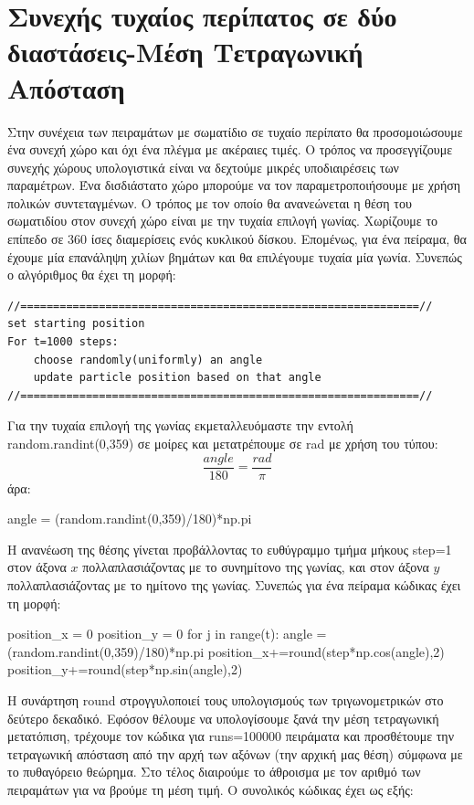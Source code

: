 \section{Συνεχής τυχαίος περίπατος σε δύο διαστάσεις-Μέση Τετραγωνική Απόσταση}
\label{CRW}
Στην συνέχεια των πειραμάτων με σωματίδιο σε τυχαίο περίπατο θα προσομοιώσουμε ένα συνεχή χώρο και όχι ένα πλέγμα με ακέραιες τιμές. Ο τρόπος να προσεγγίζουμε συνεχής χώρους υπολογιστικά είναι να δεχτούμε μικρές υποδιαιρέσεις των παραμέτρων. Ένα δισδιάστατο χώρο μπορούμε να τον παραμετροποιήσουμε με χρήση πολικών συντεταγμένων. Ο τρόπος με τον οποίο θα ανανεώνεται η θέση του σωματιδίου στον συνεχή χώρο είναι με την τυχαία επιλογή γωνίας. Χωρίζουμε το επίπεδο σε 360 ίσες διαμερίσεις ενός κυκλικού δίσκου. Επομένως, για ένα πείραμα, θα έχουμε μία επανάληψη χιλίων βημάτων και θα επιλέγουμε τυχαία μία γωνία. Συνεπώς ο αλγόριθμος θα έχει τη μορφή:
\en
\begin{lstlisting}
//=============================================================//
set starting position 
For t=1000 steps:
    choose randomly(uniformly) an angle 
    update particle position based on that angle
//=============================================================//
\end{lstlisting}
\gr 
Για την τυχαία επιλογή της γωνίας εκμεταλλευόμαστε την εντολή { \en random.randint(0,359)} σε μοίρες και μετατρέπουμε σε {\en rad} με χρήση του τύπου: 
\begin{equation}
\frac{angle}{180}=\frac{rad}{\pi}
\end{equation}
άρα:
\en
\begin{python}
angle = (random.randint(0,359)/180)*np.pi
\end{python}
\gr 
Η ανανέωση της θέσης γίνεται προβάλλοντας το ευθύγραμμο τμήμα μήκους {\en step}=1 στον άξονα $x$ πολλαπλασιάζοντας με το συνημίτονο της γωνίας, και στον άξονα $y$ πολλαπλασιάζοντας με το ημίτονο της γωνίας.
\noindent
Συνεπώς για ένα πείραμα κώδικας έχει τη μορφή:
\en 
\begin{python}
position_x = 0
position_y = 0
for j in range(t):
    angle = (random.randint(0,359)/180)*np.pi
    position_x+=round(step*np.cos(angle),2)
    position_y+=round(step*np.sin(angle),2)
\end{python}
\gr H συνάρτηση {\en round} στρογγυλοποιεί τους υπολογισμούς των  τριγωνομετρικών στο δεύτερο δεκαδικό. Εφόσον θέλουμε να υπολογίσουμε ξανά την μέση τετραγωνική μετατόπιση, τρέχουμε τον κώδικα για {\en runs}=100000 πειράματα και προσθέτουμε την τετραγωνική απόσταση από την αρχή των αξόνων (την αρχική μας θέση) σύμφωνα με το πυθαγόρειο θεώρημα. Στο τέλος διαιρούμε το άθροισμα με τον αριθμό των πειραμάτων για να βρούμε τη μέση τιμή. Ο συνολικός κώδικας έχει ως εξής:
